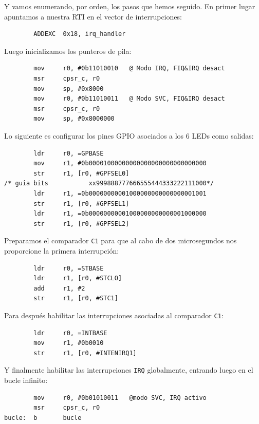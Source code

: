 Y vamos enumerando, por orden, los pasos que hemos seguido. En primer lugar apuntamos a nuestra
RTI en el vector de interrupciones:

\begin{lstlisting}
        ADDEXC  0x18, irq_handler
\end{lstlisting}

Luego inicializamos los punteros de pila:

\begin{lstlisting}
        mov     r0, #0b11010010   @ Modo IRQ, FIQ&IRQ desact
        msr     cpsr_c, r0
        mov     sp, #0x8000
        mov     r0, #0b11010011   @ Modo SVC, FIQ&IRQ desact
        msr     cpsr_c, r0
        mov     sp, #0x8000000
\end{lstlisting}

Lo siguiente es configurar los pines GPIO asociados a los 6 LEDs como salidas:

\begin{lstlisting}
        ldr     r0, =GPBASE
        mov     r1, #0b00001000000000000000000000000000
        str     r1, [r0, #GPFSEL0]
/* guia bits           xx999888777666555444333222111000*/
        ldr     r1, =0b00000000001000000000000000001001
        str     r1, [r0, #GPFSEL1]
        ldr     r1, =0b00000000001000000000000001000000
        str     r1, [r0, #GPFSEL2]
\end{lstlisting}

Preparamos el comparador {\tt C1} para que al cabo de dos microsegundos nos proporcione la primera
interrupción:

\begin{lstlisting}
        ldr     r0, =STBASE
        ldr     r1, [r0, #STCLO]
        add     r1, #2
        str     r1, [r0, #STC1]
\end{lstlisting}

Para después habilitar las interrupciones asociadas al comparador {\tt C1}:

\begin{lstlisting}
        ldr     r0, =INTBASE
        mov     r1, #0b0010
        str     r1, [r0, #INTENIRQ1]
\end{lstlisting}

Y finalmente habilitar las interrupciones {\tt IRQ} globalmente, entrando luego en
el bucle infinito:

\begin{lstlisting}
        mov     r0, #0b01010011   @modo SVC, IRQ activo
        msr     cpsr_c, r0
bucle:  b       bucle
\end{lstlisting}

